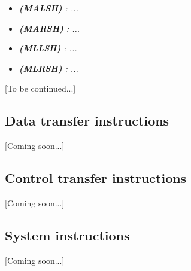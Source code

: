 \begin{multicols}{2}
\begin{itemize}
                \item \textit{\textbf{(MALSH) }: ...}

                \item \textit{\textbf{(MARSH) }: ...}

                \item \textit{\textbf{(MLLSH) }: ...}
                
                \item \textit{\textbf{(MLRSH) }: ...}

            \end{itemize}  

        \end{multicols}

        [To be continued...]

    \subsection{Data transfer instructions}

        [Coming soon...]

    \subsection{Control transfer instructions}

        [Coming soon...]

    \subsection{System instructions}

        [Coming soon...]